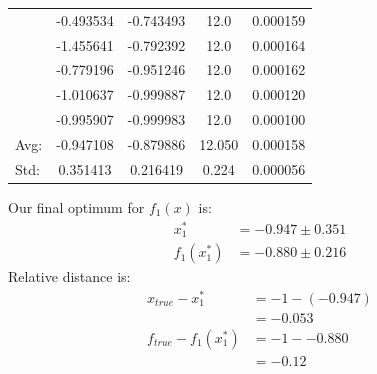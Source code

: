 \documentclass[11pt,onside]{article}
\begin{document}
\begin{description}
\begin {table}[ht]
\begin{tabular}{lcccc}
  & -0.493534 & -0.743493 &            12.0 &    0.000159 \\
  & -1.455641 & -0.792392 &            12.0 &    0.000164 \\
  & -0.779196 & -0.951246 &            12.0 &    0.000162 \\
  & -1.010637 & -0.999887 &            12.0 &    0.000120 \\
  & -0.995907 & -0.999983 &            12.0 &    0.000100 \\
\bottomrule
Avg: & -0.947108 & -0.879886 & 12.050 & 0.000158 \\
Std: & 0.351413 & 0.216419 & 0.224 & 0.000056 \\
\bottomrule
\end{tabular}
\end{table}

Our final optimum for $f_{1}(x)$ is:
\begin{align*}
x_{1}^{*} &= -0.947 \pm 0.351 \\
f_{1}(x_{1}^{*}) &= -0.880 \pm 0.216
\end{align*}
Relative distance is:
\begin{align*}
x_{true} - x_{1}^{*} &= -1 - (-0.947) \\
                     &= -0.053 \\
f_{true} - f_{1}(x_{1}^{*}) &= -1 - -0.880 \\
&= -0.12
\end{align*}



\end{description}
\end{document}
